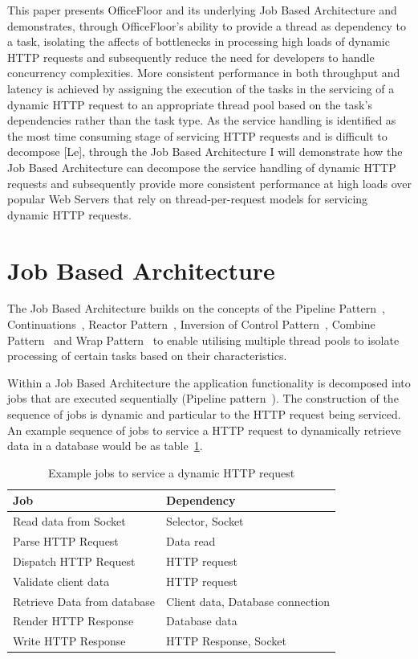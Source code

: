 \documentclass[conference]{ieee/IEEEtran}
\begin{document}
This paper presents OfficeFloor and its underlying Job Based Architecture and
demonstrates, through OfficeFloor's ability to provide a thread as dependency
to a task, isolating the affects of bottlenecks in processing high loads of
dynamic HTTP requests and subsequently reduce the need for developers to handle
concurrency complexities.  More consistent performance in both throughput and
latency is achieved by assigning the execution of the tasks in the servicing of
a dynamic HTTP request to an appropriate thread pool based on the task's
dependencies rather than the task type.  As the service handling is identified
as the most time consuming stage of servicing HTTP requests and is difficult to
decompose [Le], through the Job Based Architecture I will demonstrate how the
Job Based Architecture can decompose the service handling of dynamic HTTP
requests and subsequently provide more consistent performance at high loads
over popular Web Servers that rely on thread-per-request models for servicing
dynamic HTTP requests.

\section{Job Based Architecture}
The Job Based Architecture builds on the concepts of the Pipeline
Pattern~\cite{pipeline}, Continuations~\cite{continuations}, Reactor
Pattern~\cite{reactor}, Inversion of Control Pattern~\cite{ioc}, Combine
Pattern~\cite{pipeline} and Wrap Pattern~\cite{pipeline} to enable utilising multiple thread
pools to isolate processing of certain tasks based on their characteristics.

Within a Job Based Architecture the application functionality is decomposed
into jobs that are executed sequentially (Pipeline pattern~\cite{pipeline}).  The
construction of the sequence of jobs is dynamic and particular to the HTTP
request being serviced.  An example sequence of jobs to service a HTTP request
to dynamically retrieve data in a database would be as table~\ref{tab:example_request_jobs}. 

\begin{table}[!t]
\renewcommand{\arraystretch}{1.3}
\caption{Example jobs to service a dynamic HTTP request}
\label{tab:example_request_jobs}
\centering
\begin{tabular}{l||l}
\hline
\bfseries Job & \bfseries Dependency \\
\hline
\hline
Read data from Socket & Selector, Socket \\
\hline
Parse HTTP Request & Data read \\
\hline
Dispatch HTTP Request & HTTP request \\
\hline
Validate client data & HTTP request \\
\hline
Retrieve Data from database & Client data, Database connection \\
\hline
Render HTTP Response & Database data \\
\hline
Write HTTP Response & HTTP Response, Socket \\
\hline
\end{tabular}
\end{table}
\end{document}
